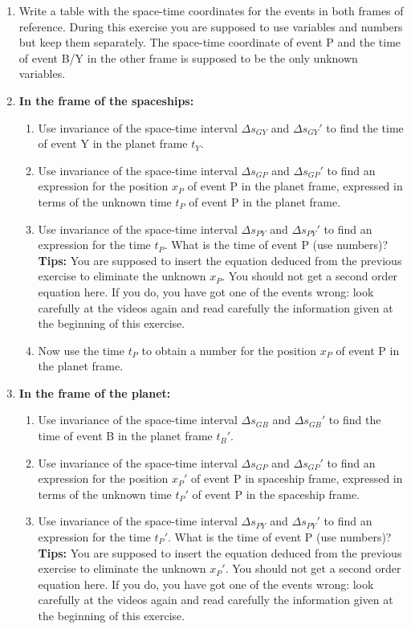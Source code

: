 {\begin{multicols}{2}
\begin{enumerate}
\item Write a table with the space-time coordinates for the events in both frames of reference. During this exercise you are supposed to use variables and numbers but keep them separately. The space-time coordinate of event P and the time of event B/Y in the other frame is supposed to be the only unknown variables.
\item {\bf In the frame of the spaceships:}
\begin{enumerate}
\item Use invariance of the space-time interval $\Delta s_{GY}$ and $\Delta s_{GY}'$ to find the time of event Y in the planet frame $t_Y$.
\item Use invariance of the space-time interval $\Delta s_{GP}$ and $\Delta s_{GP}'$ to find an expression for the position $x_P$ of event P in the planet frame, expressed in terms of the unknown time $t_P$ of event P in the planet frame.
\item Use invariance of the space-time interval $\Delta s_{PY}$ and $\Delta s_{PY}'$ to find an expression for the time $t_P$. What is the time of event P (use numbers)? {\bf Tips:} You are supposed to insert the equation deduced from the previous exercise to eliminate the unknown $x_P$. You should not get a second order equation here. If you do, you have got one of the events wrong: look carefully at the videos again and read carefully the information given at the beginning of this exercise.
\item Now use the time $t_P$ to obtain a number for the position $x_P$ of event P in the planet frame.
\end{enumerate}
\item {\bf In the frame of the planet:}
\begin{enumerate}
\item Use invariance of the space-time interval $\Delta s_{GB}$ and $\Delta s_{GB}'$ to find the time of event B in the planet frame $t_B'$.
\item Use invariance of the space-time interval $\Delta s_{GP}$ and $\Delta s_{GP}'$ to find an expression for the position $x_P'$ of event P in spaceship frame, expressed in terms of the unknown time $t_P'$ of event P in the spaceship frame.
\item Use invariance of the space-time interval $\Delta s_{PY}$ and $\Delta s_{PY}'$ to find an expression for the time $t_P'$. What is the time of event P (use numbers)? {\bf Tips:} You are supposed to insert the equation deduced from the previous exercise to eliminate the unknown $x_P'$. You should not get a second order equation here. If you do, you have got one of the events wrong: look carefully at the videos again and read carefully the information given at the beginning of this exercise.

\end{enumerate}
\end{enumerate}
\end{multicols}}
